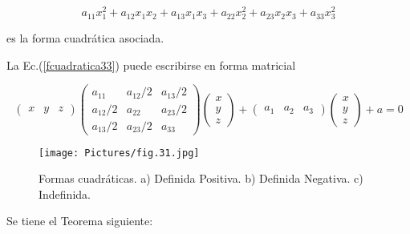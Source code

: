 $$a_{11}x_1^{2}+a_{12}x_1x_2+a_{13}x_1x_3+a_{22}x_2^{2}+a_{23}x_2x_3+a_{33}x_3^{2}$$

\bigskip

 es la forma cuadrática asociada.

 \bigskip

 \bigskip
 
La Ec.(\ref{fcuadratica33}) puede escribirse en forma matricial

 \bigskip
 
\begin{equation*}
\left(\begin{array}{ccc} x & y & z 
\end{array}
 \right) \left(\begin{array}{ccc} a_{11} & a_{12}/2  & a_{13}/2  \\a_{12}/2 & a_{22} & a_{23}/2 \\a_{13}/2  & a_{23}/2 & a_{33}
\end{array}
 \right)  \left(\begin{array}{c} x \\y  \\z
\end{array}
 \right)+ \left(\begin{array}{ccc}a_1 & a_2& a_3
\end{array}
 \right) \left(\begin{array}{c} x \\y \\z 
\end{array}
 \right) +a=0\label{fcuadraticatodaR3
 }
\end{equation*}

 \bigskip
\begin{figure}
    \centering
    \texttt{[image: Pictures/fig.31.jpg]}
    \caption{Formas cuadráticas. a) Definida Positiva. b) Definida Negativa. c) Indefinida.}
    \label{FCUADRATICAS}
\end{figure} 

Se tiene el Teorema siguiente:

